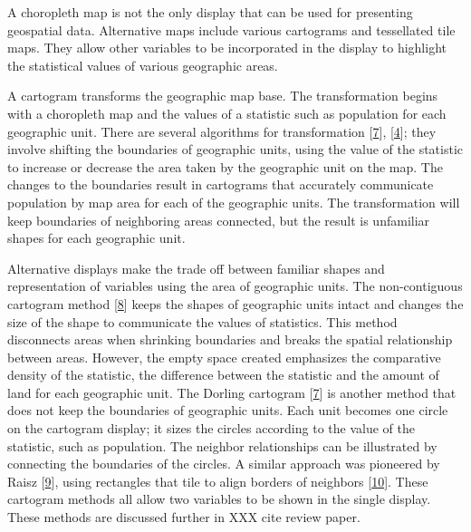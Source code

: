 \documentclass[conference,final,]{IEEEtran}
\begin{document}
A choropleth map is not the only display that can be used for presenting geospatial data.
Alternative maps include various cartograms and tessellated tile maps. They allow other variables to be incorporated in the display to highlight the statistical values of various geographic areas.

A cartogram transforms the geographic map base. The transformation begins with a choropleth map and the values of a statistic such as population for each geographic unit. There are several algorithms for transformation {[}\protect\hyperlink{ref-ACTUC}{7}{]}, {[}\protect\hyperlink{ref-CBATCC}{4}{]}; they involve shifting the boundaries of geographic units, using the value of the statistic to increase or decrease the area taken by the geographic unit on the map.
The changes to the boundaries result in cartograms that accurately communicate population by map area for each of the geographic units. The transformation will keep boundaries of neighboring areas connected, but the result is unfamiliar shapes for each geographic unit.

Alternative displays make the trade off between familiar shapes and representation of variables using the area of geographic units. The non-contiguous cartogram method {[}\protect\hyperlink{ref-NAC}{8}{]} keeps the shapes of geographic units intact and changes the size of the shape to communicate the values of statistics. This method disconnects areas when shrinking boundaries and breaks the spatial relationship between areas. However, the empty space created emphasizes the comparative density of the statistic, the difference between the statistic and the amount of land for each geographic unit.
The Dorling cartogram {[}\protect\hyperlink{ref-ACTUC}{7}{]} is another method that does not keep the boundaries of geographic units. Each unit becomes one circle on the cartogram display; it sizes the circles according to the value of the statistic, such as population. The neighbor relationships can be illustrated by connecting the boundaries of the circles. A similar approach was pioneered by Raisz {[}\protect\hyperlink{ref-RSCW}{9}{]}, using rectangles that tile to align borders of neighbors {[}\protect\hyperlink{ref-CDWCS}{10}{]}.
These cartogram methods all allow two variables to be shown in the single display. These methods are discussed further in XXX cite review paper.
\end{document}
